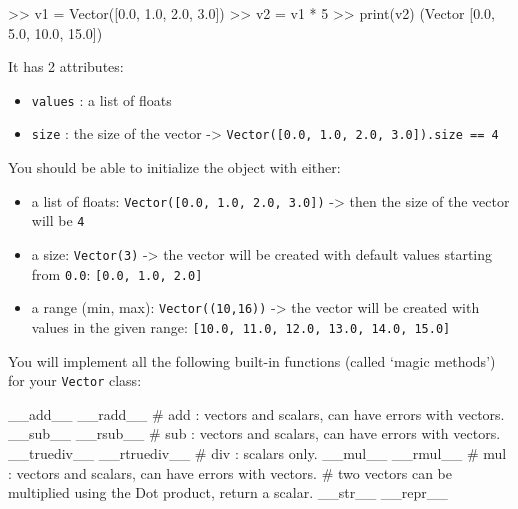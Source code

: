 \documentclass[]{article}
\newenvironment{Shaded}{\begin{snugshade}}{\end{snugshade}}
\newcommand{\BuiltInTok}[1]{\textcolor[rgb]{0.50,0.55,0.55}{#1}}
\newcommand{\CommentTok}[1]{\textcolor[rgb]{0.48,0.49,0.49}{#1}}
\newcommand{\DecValTok}[1]{\textcolor[rgb]{0.96,0.45,0.00}{#1}}
\newcommand{\FloatTok}[1]{\textcolor[rgb]{0.96,0.45,0.00}{#1}}
\newcommand{\FunctionTok}[1]{\textcolor[rgb]{0.56,0.27,0.68}{#1}}
\newcommand{\NormalTok}[1]{\textcolor[rgb]{0.81,0.81,0.76}{#1}}
\newcommand{\OperatorTok}[1]{\textcolor[rgb]{0.81,0.81,0.76}{#1}}
\begin{document}
\begin{Shaded}
\begin{Highlighting}[]
\OperatorTok{>>}\NormalTok{ v1 }\OperatorTok{=}\NormalTok{ Vector([}\FloatTok{0.0}\NormalTok{, }\FloatTok{1.0}\NormalTok{, }\FloatTok{2.0}\NormalTok{, }\FloatTok{3.0}\NormalTok{])}
\OperatorTok{>>}\NormalTok{ v2 }\OperatorTok{=}\NormalTok{ v1 }\OperatorTok{*} \DecValTok{5}
\OperatorTok{>>} \BuiltInTok{print}\NormalTok{(v2)}
\NormalTok{(Vector [}\FloatTok{0.0}\NormalTok{, }\FloatTok{5.0}\NormalTok{, }\FloatTok{10.0}\NormalTok{, }\FloatTok{15.0}\NormalTok{])}
\end{Highlighting}
\end{Shaded}

It has 2 attributes:

\begin{itemize}
\item
  \texttt{values} : a list of floats
\item
  \texttt{size} : the size of the vector -\textgreater{}
  \texttt{Vector({[}0.0,\ 1.0,\ 2.0,\ 3.0{]}).size\ ==\ 4}
\end{itemize}

You should be able to initialize the object with either:

\begin{itemize}
\item
  a list of floats: \texttt{Vector({[}0.0,\ 1.0,\ 2.0,\ 3.0{]})}
  -\textgreater{} then the size of the vector will be \texttt{4}
\item
  a size: \texttt{Vector(3)} -\textgreater{} the vector will be created
  with default values starting from \texttt{0.0}:
  \texttt{{[}0.0,\ 1.0,\ 2.0{]}}
\item
  a range (min, max): \texttt{Vector((10,16))} -\textgreater{} the
  vector will be created with values in the given range:
  \texttt{{[}10.0,\ 11.0,\ 12.0,\ 13.0,\ 14.0,\ 15.0{]}}
\end{itemize}

You will implement all the following built-in functions (called `magic
methods') for your \texttt{Vector} class:

\begin{Shaded}
\begin{Highlighting}[]
    \FunctionTok{__add__}
    \FunctionTok{__radd__}
    \CommentTok{# add : vectors and scalars, can have errors with vectors.}
    \FunctionTok{__sub__}
    \FunctionTok{__rsub__}
    \CommentTok{# sub : vectors and scalars, can have errors with vectors.}
    \FunctionTok{__truediv__}
    \FunctionTok{__rtruediv__}
    \CommentTok{# div : scalars only.}
    \FunctionTok{__mul__}
    \FunctionTok{__rmul__}
    \CommentTok{# mul : vectors and scalars, can have errors with vectors.}
    \CommentTok{# two vectors can be multiplied using the Dot product, return a scalar.}
    \FunctionTok{__str__}
    \FunctionTok{__repr__}
\end{Highlighting}
\end{Shaded}
\end{document}
